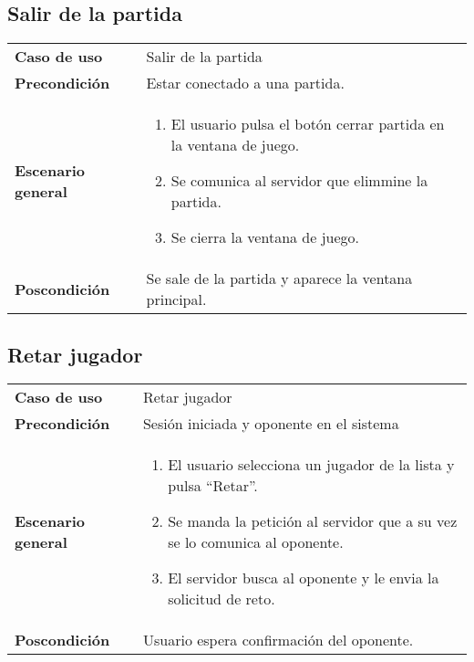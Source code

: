 \subsection{Salir de la partida}
{\footnotesize
\begin{tabularx}{0.95\textwidth}{p{}|X}

\textbf{Caso de uso} & Salir de la partida \\

\textbf{Precondición} & Estar conectado a una partida.\\

\textbf{Escenario general} & \begin{enumerate}
\item El usuario pulsa el botón cerrar partida en la ventana de juego.
\item Se comunica al servidor que elimmine la partida.
\item Se cierra la ventana de juego.

\end{enumerate} \\

\textbf{Poscondición} & Se sale de la partida y aparece la ventana principal.

\end{tabularx}
}

\subsection{Retar jugador}
{\footnotesize
\begin{tabularx}{0.95\textwidth}{p{}|X}

\textbf{Caso de uso} & Retar jugador \\

\textbf{Precondición} & Sesión iniciada y oponente en el sistema \\

\textbf{Escenario general} & \begin{enumerate}
\item El usuario selecciona un jugador de la lista y pulsa ``Retar''.
\item Se manda la petición al servidor que a su vez se lo comunica al oponente.
\item El servidor busca al oponente y le envia la solicitud de reto.
\end{enumerate} \\

\textbf{Poscondición} & Usuario espera confirmación del oponente.

\end{tabularx}
}

